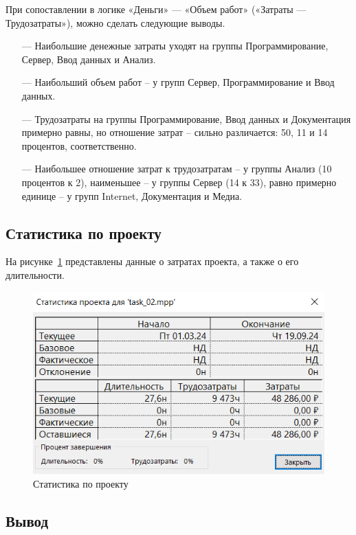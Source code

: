 При сопоставлении в логике «Деньги» --- «Объем работ» («Затраты ---
Трудозатраты»), можно сделать следующие выводы.
\begin{itemize}
    \item[---] Наибольшие денежные затраты уходят на группы Программирование,
Сервер, Ввод данных и Анализ.
    \item[---] Наибольший объем работ – у групп Сервер, Программирование
и Ввод данных.
    \item[---] Трудозатраты на группы Программирование, Ввод данных и
Документация примерно равны, но отношение затрат – сильно
различается: 50, 11 и 14 процентов, соответственно.
    \item[---] Наибольшее отношение затрат к трудозатратам – у группы Анализ (10
процентов к 2), наименьшее – у группы Сервер (14 к 33), равно
примерно единице – у групп Internet, Документация и Медиа.
\end{itemize}


\subsection*{Статистика по проекту}

На рисунке~\ref{fig:u20} представлены данные о затратах проекта, а также о его длительности.

\begin{figure}[h!]
	\begin{center}
		\includegraphics[scale=0.92]{inc/img/p_10.jpg}
	\end{center}
	\captionsetup{justification=centering}
	\caption{Статистика по проекту}
	\label{fig:u20}
\end{figure}

\subsection*{Вывод}

